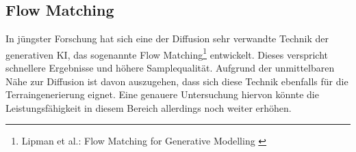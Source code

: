 \subsection{Flow Matching}

In jüngster Forschung hat sich eine der Diffusion sehr verwandte Technik der generativen KI, das sogenannte Flow Matching\footnote{
    Lipman et al.: Flow Matching for Generative Modelling
    \cite{lipman2023flowmatchinggenerativemodeling}
} entwickelt. Dieses verspricht schnellere Ergebnisse und höhere Samplequalität. Aufgrund der unmittelbaren Nähe zur Diffusion ist davon auszugehen, dass sich diese Technik ebenfalls für die Terraingenerierung eignet. Eine genauere Untersuchung hiervon könnte die Leistungsfähigkeit in diesem Bereich allerdings noch weiter erhöhen.  